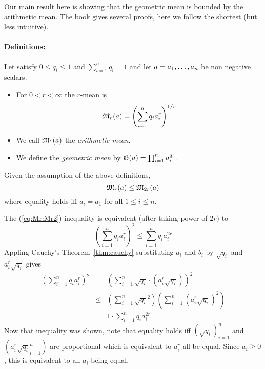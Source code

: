 Our main result here is showing that the geometric mean is bounded
by the arithmetic mean. The book \cite{Hardy:1952:I} gives several proofs,
here we follow the shortest (but less intuitive).

\paragraph{Definitions:}
Let  satisfy \(0\leq q_i\leq 1\) and
\(\sum_{i=1}^n q_i = 1\) and let \(a=a_1,\ldots,a_{n}\) be non negative scalars.
\begin{itemize}
 \item For \(0<r<\infty\) the $r$-mean is
   \begin{equation}
     \mathfrak{M}_r(a) = \left(\sum_{i=1}^n q_i a_i^r\right)^{1/r}
   \end{equation}
 \item We call \(\mathfrak{M}_1(a)\) the \emph{arithmetic mean}.
 \item We define the \emph{geometric mean} by
        \(\mathfrak{G}(a) = \prod_{i=1}^n a_i^{q_i}\).
\end{itemize}

\begin{lem} \label{lem:Mr:Mr2}
Given the assumption of the above definitions,
\begin{equation} \label{eq:Mr:Mr2}
\mathfrak{M}_r(a) \leq \mathfrak{M}_{2r}(a)
\end{equation}
where equality holds
iff \(a_i=a_1\) for all \(1\leq i \leq n\).
\end{lem}
\begin{thmproof}
The (\ref{eq:Mr:Mr2}) inequality
is equivalent (after taking power of \(2r\)) to
\begin{equation*}
\left(\sum_{i=1}^n q_i a_i^r\right)^2  \leq \sum_{i=1}^n q_i a_i^{2r}
\end{equation*}
Appling Cauchy's Theorem~\ref{thm:cauchy} substituting \(a_i\) and \(b_i\)
by \(\sqrt{q_i}\) and \(a_i^r\sqrt{q_i}\) gives
\begin{eqnarray*}
\left(\sum_{i=1}^n q_i a_i^r\right)^2
&=& \left(\sum_{i=1}^n \sqrt{q_i} \cdot (a_i^r\sqrt{q_i})\right)^2 \\
&\leq & (\sum_{i=1}^n \sqrt{q_i}^2)
        (\sum_{i=1}^n (a_i^r\sqrt{q_i})^2) \\
&=& 1 \cdot \sum_{i=1}^n q_i a_i^{2r}
\end{eqnarray*}
Now that inequality was shown, note that equality holds iff
\((\sqrt{q_i})_{i=1}^n\) and
\((a_i^r\sqrt{q_i}_{i=1}^n)\)  are proportional which is equivalent
to \(a_i^r\) all be equal. Since \(a_i\geq 0\), this
is equivalent to all \(a_i\) being equal.
\end{thmproof}


